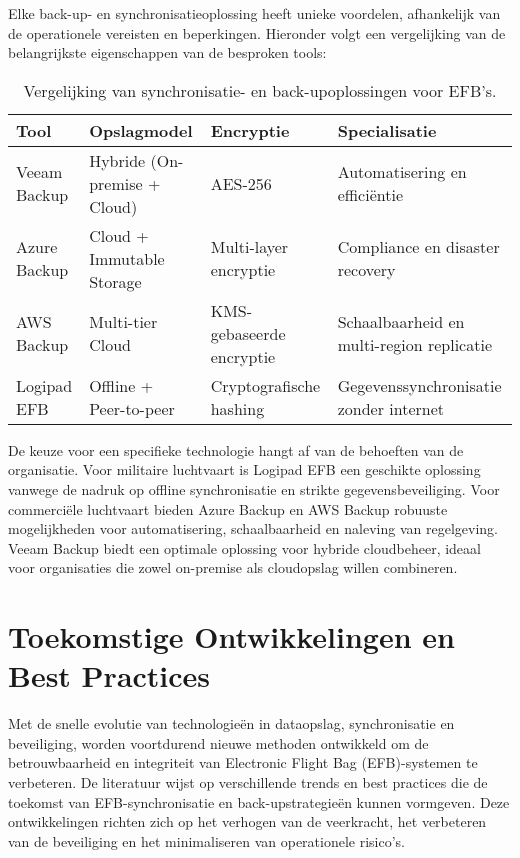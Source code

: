Elke back-up- en synchronisatieoplossing heeft unieke voordelen, afhankelijk van de operationele vereisten en beperkingen. Hieronder volgt een vergelijking van de belangrijkste eigenschappen van de besproken tools:

\begin{table}[h]
    \centering
    \begin{tabular}{|l|l|l|l|}
        \hline
        \textbf{Tool} & \textbf{Opslagmodel} & \textbf{Encryptie} & \textbf{Specialisatie} \\
        \hline
        Veeam Backup & Hybride (On-premise + Cloud) & AES-256 & Automatisering en efficiëntie \\
        Azure Backup & Cloud + Immutable Storage & Multi-layer encryptie & Compliance en disaster recovery \\
        AWS Backup & Multi-tier Cloud & KMS-gebaseerde encryptie & Schaalbaarheid en multi-region replicatie \\
        Logipad EFB & Offline + Peer-to-peer & Cryptografische hashing & Gegevenssynchronisatie zonder internet \\
        \hline
    \end{tabular}
    \caption{Vergelijking van synchronisatie- en back-upoplossingen voor EFB's.}
    \label{tab:backups}
\end{table}

De keuze voor een specifieke technologie hangt af van de behoeften van de organisatie. Voor militaire luchtvaart is Logipad EFB een geschikte oplossing vanwege de nadruk op offline synchronisatie en strikte gegevensbeveiliging. Voor commerciële luchtvaart bieden Azure Backup en AWS Backup robuuste mogelijkheden voor automatisering, schaalbaarheid en naleving van regelgeving. Veeam Backup biedt een optimale oplossing voor hybride cloudbeheer, ideaal voor organisaties die zowel on-premise als cloudopslag willen combineren.

        
\section{Toekomstige Ontwikkelingen en Best Practices}
\label{sec:toekomstige-ontwikkelingen}

Met de snelle evolutie van technologieën in dataopslag, synchronisatie en beveiliging, worden voortdurend nieuwe methoden ontwikkeld om de betrouwbaarheid en integriteit van Electronic Flight Bag (EFB)-systemen te verbeteren. De literatuur wijst op verschillende trends en best practices die de toekomst van EFB-synchronisatie en back-upstrategieën kunnen vormgeven. Deze ontwikkelingen richten zich op het verhogen van de veerkracht, het verbeteren van de beveiliging en het minimaliseren van operationele risico's.

